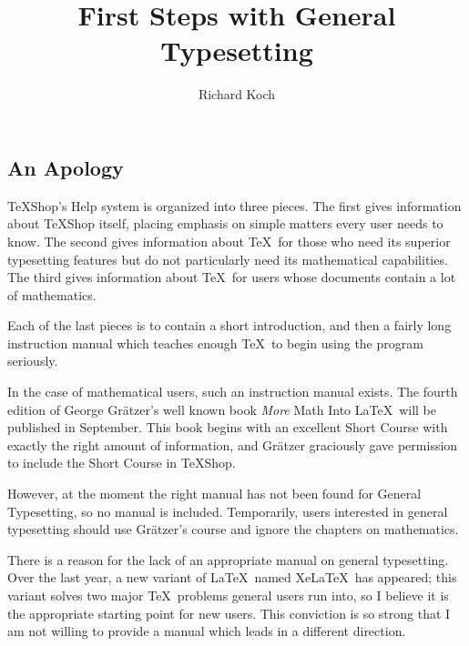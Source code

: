 \documentclass[11pt, oneside]{amsart}
\title{First Steps with General Typesetting }
\author{Richard Koch}
\begin{document}
\maketitle
\begin{multicols}{2}
\thispagestyle{empty}

\section{An Apology}

TeXShop's Help system is organized into three pieces. The first gives information about TeXShop itself, placing emphasis on simple matters every user needs to know.   The second gives information about \TeX\ for those who need its superior typesetting features but do not particularly need its mathematical capabilities. The third gives information about \TeX\ for users whose documents contain a lot of mathematics. 

Each of the last pieces is to contain a short introduction, and then a fairly long instruction manual which teaches enough \TeX\ to begin using the program seriously.

In the case of mathematical users, such an instruction manual exists.  The fourth edition of George Gr\"atzer's well known book \emph{More} Math Into \LaTeX\ will be published in September. This book begins with an excellent Short Course with exactly the right amount of information, and Gr\"atzer graciously gave permission to include the Short Course in  TeXShop.

However, at the moment the right manual has not been found  for  General Typesetting, so no manual is included. Temporarily, users interested in general typesetting should use Gr\"atzer's course and ignore the chapters on mathematics.

There is a reason for the lack of an appropriate manual on general typesetting. Over the last year, a new variant of \LaTeX\ named Xe\LaTeX\ has appeared; this variant solves two major \TeX\ problems general users run into, so I believe it is the appropriate starting point for new users. This conviction is so strong that I am not  willing to provide a manual which leads in a different direction.


\end{multicols}
\end{document}
